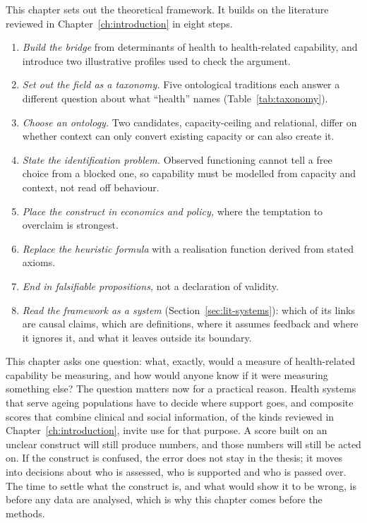 \label{ch:theory}

\begin{ataglance}
This chapter sets out the theoretical framework. It builds on the literature reviewed in Chapter~\ref{ch:introduction} in eight steps.
\begin{enumerate}\setlength{\itemsep}{2pt}
\item \emph{Build the bridge} from determinants of health to health-related capability, and introduce two illustrative profiles used to check the argument.
\item \emph{Set out the field as a taxonomy.} Five ontological traditions each answer a different question about what ``health'' names (Table~\ref{tab:taxonomy}).
\item \emph{Choose an ontology.} Two candidates, capacity-ceiling and relational, differ on whether context can only convert existing capacity or can also create it.
\item \emph{State the identification problem.} Observed functioning cannot tell a free choice from a blocked one, so capability must be modelled from capacity and context, not read off behaviour.
\item \emph{Place the construct in economics and policy,} where the temptation to overclaim is strongest.
\item \emph{Replace the heuristic formula} with a realisation function derived from stated axioms.
\item \emph{End in falsifiable propositions,} not a declaration of validity.
\item \emph{Read the framework as a system} (Section~\ref{sec:lit-systems}): which of its links are causal claims, which are definitions, where it assumes feedback and where it ignores it, and what it leaves outside its boundary.
\end{enumerate}
\end{ataglance}

\noindent
This chapter asks one question: what, exactly, would a measure of health-related capability be measuring, and how would anyone know if it were measuring something else? The question matters now for a practical reason. Health systems that serve ageing populations have to decide where support goes, and composite scores that combine clinical and social information, of the kinds reviewed in Chapter~\ref{ch:introduction}, invite use for that purpose. A score built on an unclear construct will still produce numbers, and those numbers will still be acted on. If the construct is confused, the error does not stay in the thesis; it moves into decisions about who is assessed, who is supported and who is passed over. The time to settle what the construct is, and what would show it to be wrong, is before any data are analysed, which is why this chapter comes before the methods.

